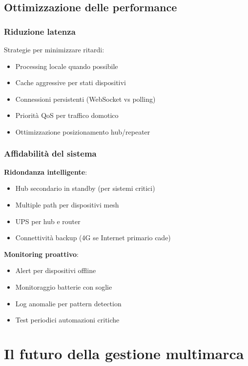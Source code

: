 \subsection{Ottimizzazione delle performance}

\subsubsection{Riduzione latenza}

Strategie per minimizzare ritardi:
\begin{itemize}
    \item Processing locale quando possibile
    \item Cache aggressive per stati dispositivi
    \item Connessioni persistenti (WebSocket vs polling)
    \item Priorità QoS per traffico domotico
    \item Ottimizzazione posizionamento hub/repeater
\end{itemize}

\subsubsection{Affidabilità del sistema}

\textbf{Ridondanza intelligente}:
\begin{itemize}
    \item Hub secondario in standby (per sistemi critici)
    \item Multiple path per dispositivi mesh
    \item UPS per hub e router
    \item Connettività backup (4G se Internet primario cade)
\end{itemize}

\textbf{Monitoring proattivo}:
\begin{itemize}
    \item Alert per dispositivi offline
    \item Monitoraggio batterie con soglie
    \item Log anomalie per pattern detection
    \item Test periodici automazioni critiche
\end{itemize}

\section{Il futuro della gestione multimarca}

